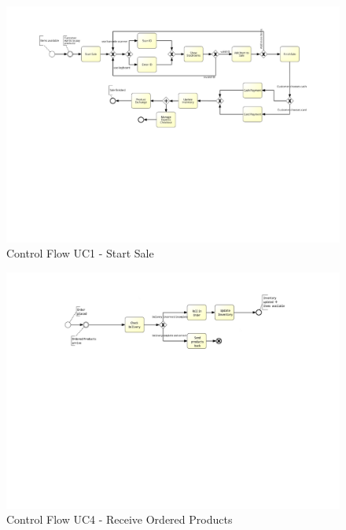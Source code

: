 \begin{figure}[h!]
	\centering
	\includegraphics[width=\textwidth, trim={5cm 10cm 4cm 1cm}]{img/UC1Control.pdf}
	\caption{Control Flow UC1 - Start Sale}
	\label{fig:UC1Control}
\end{figure}


\begin{figure}[h!]
	\centering
	\includegraphics[width=\textwidth, trim={7cm 14cm 6cm 1cm}]{img/UC4Control.pdf}
	\caption{Control Flow UC4 - Receive Ordered Products }
	\label{fig:UC4Control}
\end{figure}

\pagebreak

